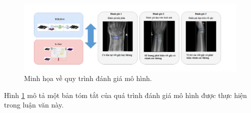 \documentclass[../the.tex]{subfiles}
\begin{document}
{\begin{itemize}
\end{itemize}

\begin{figure}[ht!]
\centering
	\includegraphics[width=1\textwidth]{images/eval.png}
	\caption{Minh họa về quy trình đánh giá mô hình.}
	\label{fig:model_eval}
\end{figure}

Hình \ref{fig:model_eval} mô tả một bản tóm tắt của quá trình đánh giá mô hình được thực hiện trong luận văn này.



}
\end{document}
